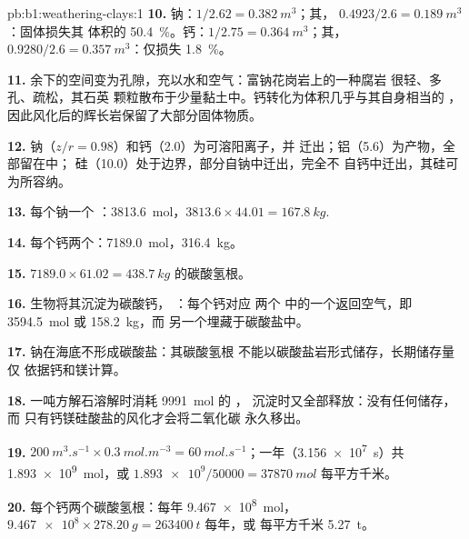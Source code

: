 \begin{solution}{pb:b1:weathering-clays:1}
\textbf{10.} 钠：$1/2.62 = \qty{0.382}{m^3}$；其，
$0.4923/2.6 = \qty{0.189}{m^3}$：固体损失其
体积的 \qty{50.4}{\percent}。钙：$1/2.75 = \qty{0.364}{m^3}$；其，
$0.9280/2.6 = \qty{0.357}{m^3}$：仅损失 \qty{1.8}{\percent}。

\textbf{11.} 余下的空间变为孔隙，充以水和空气：富钠花岗岩上的一种腐岩
很轻、多孔、疏松，其石英
颗粒散布于少量黏土中。钙转化为体积几乎与其自身相当的
，因此风化后的辉长岩保留了大部分固体物质。

\textbf{12.} 钠（$z/r = 0.98$）和钙（2.0）为可溶阳离子，并
迁出；铝（5.6）为产物，全部留在中；
硅（10.0）处于边界，部分自钠中迁出，完全不
自钙中迁出，其硅可为所容纳。

\textbf{13.} 每个钠一个 ：\qty{3813.6}{mol}，$3813.6 \times 44.01 =
\qty{167.8}{kg}$.

\textbf{14.} 每个钙两个：\qty{7189.0}{mol}，\qty{316.4}{kg}。

\textbf{15.} $7189.0 \times 61.02 = \qty{438.7}{kg}$ 的碳酸氢根。

\textbf{16.} 生物将其沉淀为碳酸钙，
：每个钙对应
两个  中的一个返回空气，即 \qty{3594.5}{mol} 或 \qty{158.2}{kg}，而
另一个埋藏于碳酸盐中。

\textbf{17.} 钠在海底不形成碳酸盐：其碳酸氢根
不能以碳酸盐岩形式储存，长期储存量仅
依据钙和镁计算。

\textbf{18.} 一吨方解石溶解时消耗 \qty{9991}{mol} 的 ，
沉淀时又全部释放：没有任何储存，而
只有钙镁硅酸盐的风化才会将二氧化碳
永久移出。

\textbf{19.} $\qty{200}{m^3.s^{-1}} \times \qty{0.3}{mol.m^{-3}} =
\qty{60}{mol.s^{-1}}$；一年（\qty{3.156e7}{s}）共 \qty{1.893e9}{mol}，或
$\num{1.893e9}/\num{50000} = \qty{37870}{mol}$ 每平方千米。

\textbf{20.} 每个钙两个碳酸氢根：每年 \qty{9.467e8}{mol}，
$\num{9.467e8}\times\qty{278.20}{g} = \qty{263400}{t}$ 每年，或
每平方千米 \qty{5.27}{t}。


\end{solution}
